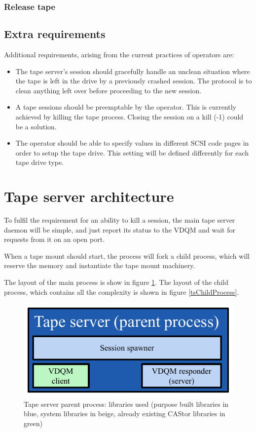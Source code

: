 \subsubsection{Release tape}

\subsection{Extra requirements}
Additional requirements, arising from the current practices of operators are:

\begin{itemize}
\item{}The tape server's session should gracefully handle an unclean situation where the 
tape is left in the drive by a previously crashed session. The protocol is to clean anything
left over before proceeding to the new session.
\item{}A tape sessions should be preemptable by the operator. This is currently achieved 
by killing the tape process. Closing the session on a kill (-1) could be a solution.
\item{}The operator should be able to specify values in different SCSI code pages in
order to setup the tape drive. This setting will be defined differently for each tape
drive type.
\end{itemize}

\section{Tape server architecture}
To fulfil the requirement for an ability to kill a session, the main tape server daemon
will be simple, and just report its status to the VDQM and wait for requests from it on
an open port.

When a tape mount should start, the process will fork a child process, which will reserve the memory
and instantiate the tape mount machinery.

The layout of the main process is show in figure \ref{tsParentProcess}. The layout of the child process, which contains all the complexity is shown in figure \ref{tsChildProcess}.

\begin{figure}[h]
\begin{center}
\includegraphics{images/TapeServerParentProcess}
\end{center}
\caption{\label{tsParentProcess}Tape server parent process: libraries used (purpose built libraries in blue, system libraries in beige, already existing CAStor libraries in green)}
\end{figure}


